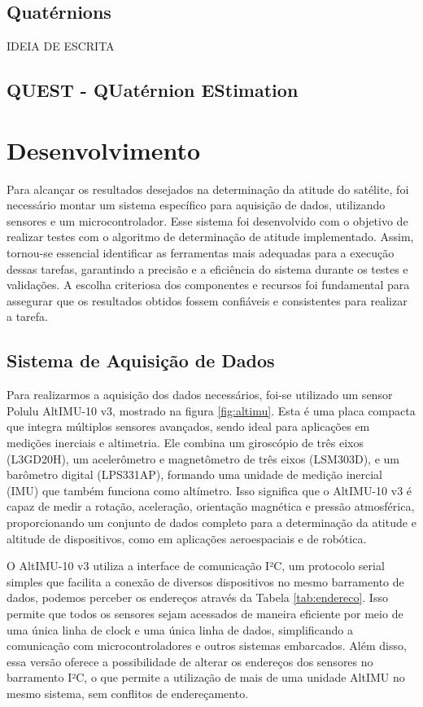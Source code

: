 \documentclass[
	12pt,				%
	openright,			%
	oneside,			%
	a4paper,			%
	english,			%
	brazil				%
	]{abntex2}
\begin{document}
\section{Quatérnions}

IDEIA DE ESCRITA

\section{QUEST - QUatérnion EStimation}


\chapter{Desenvolvimento} \label{cap:desenvolvimento}

Para alcançar os resultados desejados na determinação da atitude do satélite, foi necessário montar um sistema específico para aquisição de dados, utilizando sensores e um microcontrolador. Esse sistema foi desenvolvido com o objetivo de realizar testes com o algoritmo de determinação de atitude implementado. Assim, tornou-se essencial identificar as ferramentas mais adequadas para a execução dessas tarefas, garantindo a precisão e a eficiência do sistema durante os testes e validações. A escolha criteriosa dos componentes e recursos foi fundamental para assegurar que os resultados obtidos fossem confiáveis e consistentes para realizar a tarefa.

\section{Sistema de Aquisição de Dados}

Para realizarmos a aquisição dos dados necessários, foi-se utilizado um sensor Polulu AltIMU-10 v3, mostrado na figura \ref{fig:altimu}. Esta é uma placa compacta que integra múltiplos sensores avançados, sendo ideal para aplicações em medições inerciais e altimetria. Ele combina um giroscópio de três eixos (L3GD20H), um acelerômetro e magnetômetro de três eixos (LSM303D), e um barômetro digital (LPS331AP), formando uma unidade de medição inercial (IMU) que também funciona como altímetro. Isso significa que o AltIMU-10 v3 é capaz de medir a rotação, aceleração, orientação magnética e pressão atmosférica, proporcionando um conjunto de dados completo para a determinação da atitude e altitude de dispositivos, como em aplicações aeroespaciais e de robótica.

O AltIMU-10 v3 utiliza a interface de comunicação I²C, um protocolo serial simples que facilita a conexão de diversos dispositivos no mesmo barramento de dados, podemos perceber os endereços através da Tabela \ref{tab:endereco}. Isso permite que todos os sensores sejam acessados de maneira eficiente por meio de uma única linha de clock e uma única linha de dados, simplificando a comunicação com microcontroladores e outros sistemas embarcados. Além disso, essa versão oferece a possibilidade de alterar os endereços dos sensores no barramento I²C, o que permite a utilização de mais de uma unidade AltIMU no mesmo sistema, sem conflitos de endereçamento.
\end{document}
